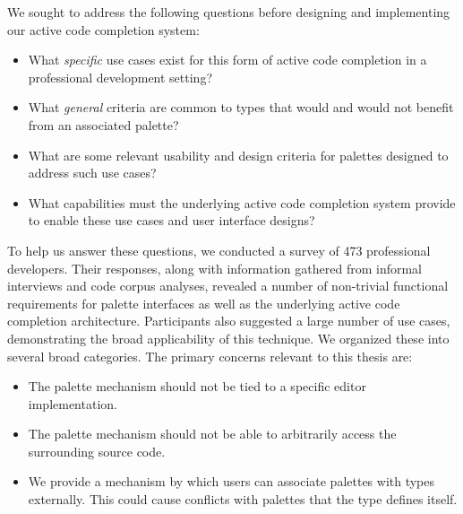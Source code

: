 \begin{contribution} 
We sought to address the following questions before designing and implementing our active code completion system:

\begin{itemize}
\item What {\it specific} use cases exist for this form of active code completion in a professional development setting? 
\item What {\it general} criteria are common to types that would and would not benefit from an associated palette?
\item What are some relevant usability and design criteria for palettes designed to address such use cases?
\item What capabilities must the underlying active code completion system provide to enable these use cases and user interface designs?
\end{itemize}

To help us answer these questions, we conducted a survey of 473 professional developers. Their responses, along with information gathered from informal interviews and code corpus analyses, revealed a number of non-trivial functional requirements for palette interfaces as well as the underlying active code completion architecture. Participants also suggested a large number of use cases, demonstrating the broad applicability of this technique. We organized these into several broad categories. The primary concerns relevant to this thesis are:
\begin{itemize}
\item The palette mechanism should not be tied to a specific editor implementation.%
\item The palette mechanism should not be able to arbitrarily access the surrounding source code. %
\item We provide a mechanism by which users can associate palettes with types externally. This could cause conflicts with palettes that the type defines itself. %
\end{itemize}

\end{contribution}

